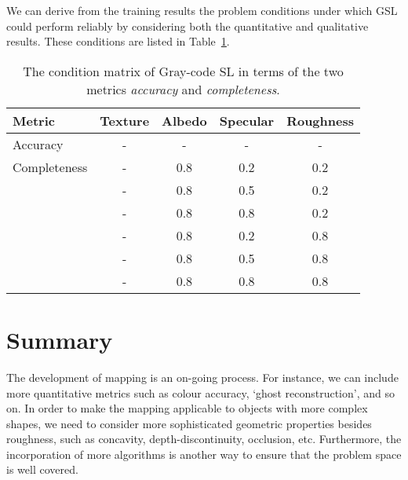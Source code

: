We can derive from the training results the problem conditions under which GSL could perform reliably by considering both the quantitative and qualitative results. These conditions are listed in Table~\ref{tab:sl_training_result}.
\begin{table}[!htbp]
  \centering
  \begin{tabular}{l*{4}{c}}
  \hline
  \textbf{Metric} & Texture & Albedo & Specular & Roughness\\
  \hline
  Accuracy     & - & - & - & -\\
  \hline
  Completeness & - & 0.8 & 0.2 & 0.2\\
               & - & 0.8 & 0.5 & 0.2\\
               & - & 0.8 & 0.8 & 0.2\\
               & - & 0.8 & 0.2 & 0.8\\
               & - & 0.8 & 0.5 & 0.8\\
               & - & 0.8 & 0.8 & 0.8\\
  \hline
  \end{tabular}
  \caption{The condition matrix of Gray-code SL in terms of the two metrics \textit{accuracy} and \textit{completeness}.}
  \label{tab:sl_training_result}
\end{table}

\section{Summary}
The development of mapping is an on-going process. For instance, we can include more quantitative metrics such as colour accuracy, `ghost reconstruction', and so on. In order to make the mapping applicable to objects with more complex shapes, we need to consider more sophisticated geometric properties besides roughness, such as concavity, depth-discontinuity, occlusion, etc. Furthermore, the incorporation of more algorithms is another way to ensure that the problem space is well covered.


